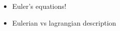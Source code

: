 \documentclass[../main.tex]{subfiles}
\begin{document}
\begin{itemize}
    \item Euler's equations!
    \item Eulerian vs lagrangian description
\end{itemize}
\end{document}

